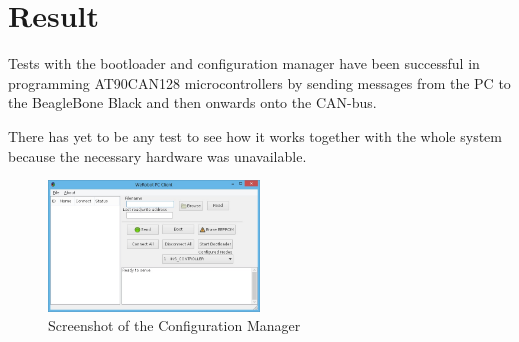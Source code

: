 \section{Result}\label{sec:result}
Tests with the bootloader and configuration manager have been successful in programming AT90CAN128 microcontrollers by sending messages from the PC to the BeagleBone Black and then onwards onto the CAN-bus.

There has yet to be any test to see how it works together with the whole system because the necessary hardware was unavailable.

\begin{figure}[h]
    \includegraphics[width=0.5\textwidth]{./figure/cm.jpg}
    \caption{Screenshot of the Configuration Manager}
    \label{fig:cm_figure}
\end{figure}



%
%

